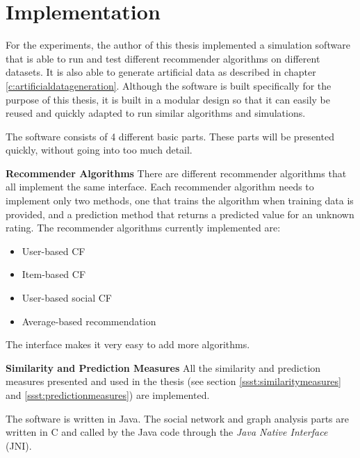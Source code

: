 \chapter{Implementation}
\label{c:implementation} For the experiments, the author of this thesis implemented a simulation software that is able to run and test different recommender algorithms on different datasets. It is also able to generate artificial data as described in chapter \ref{c:artificialdatageneration}. Although the software is built specifically for the purpose of this thesis, it is built in a modular design so that it can easily be reused and quickly adapted to run similar algorithms and simulations.
\newline

The software consists of 4 different basic parts. These parts will be presented quickly, without going into too much detail.
\newline

\textbf{Recommender Algorithms} There are different recommender algorithms that all implement the same interface. Each recommender algorithm needs to implement only two methods, one that trains the algorithm when training data is provided, and a prediction method that returns a predicted value for an unknown rating. The recommender algorithms currently implemented are:

\begin{itemize}
\item User-based CF
\item Item-based CF
\item User-based social CF
\item Average-based recommendation
\end{itemize}

The interface makes it very easy to add more algorithms.
\newline

\textbf{Similarity and Prediction Measures} All the similarity and prediction measures presented and used in the thesis (see section \ref{ssst:similaritymeasures} and \ref{ssst:predictionmeasures}) are implemented. 
\newline

The software is written in Java. The social network and graph analysis parts are written in C and called by the Java code through the \textit{Java Native Interface} (JNI).